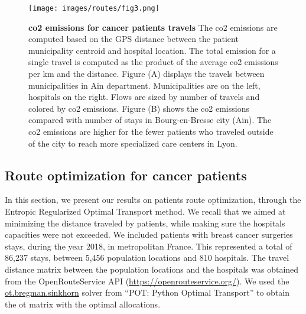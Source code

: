 \begin{figure}[h!]
    \texttt{[image: images/routes/fig3.png]}
    \centering
    \caption{ \textbf{\ac{co2} emissions for cancer patients travels} The
        \ac{co2} emissions are computed based on the GPS distance between the
        patient municipality centroid and hospital location. The total emission
        for a single travel is computed as the product of the average \ac{co2}
        emissions per km and the distance. Figure (A) displays the travels
        between municipalities in Ain department. Municipalities are on the
        left, hospitals on the right. Flows are sized by number of travels and
        colored by \ac{co2} emissions. Figure (B) shows the \ac{co2} emissions
        compared with number of stays in Bourg-en-Bresse city (Ain). The
        \ac{co2} emissions are higher for the fewer patients who traveled
        outside of the city to reach more specialized care centers in Lyon. }
    \label{fig:routes-co2-emissions}
\end{figure}

\subsection{Route optimization for cancer patients}

In this section, we present our results on patients route optimization, through
the Entropic Regularized Optimal Transport method. We recall that we aimed at
minimizing the distance traveled by patients, while making sure the hospitals
capacities were not exceeded. We included patients with breast cancer surgeries
stays, during the year 2018, in metropolitan France. This represented a total of
86,237 stays, between 5,456 population locations and 810 hospitals. The travel
distance matrix between the population locations and the hospitals was obtained
from the OpenRouteService API (\url{https://openrouteservice.org/}). We used the
\href{https://pythonot.github.io/gen_modules/ot.bregman.html#ot.bregman.sinkhorn}{ot.bregman.sinkhorn}
solver from ``POT: Python Optimal Transport'' \cite{flamary_pot_2021} to obtain
the \ac{ot} matrix with the optimal allocations.

